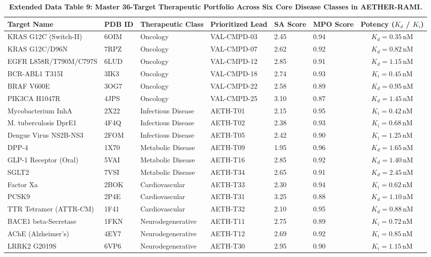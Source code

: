 \documentclass[11pt,a4paper]{article}
\begin{document}
\begin{table}[h!]
\caption{\textbf{Extended Data Table 9: Master 36-Target Therapeutic Portfolio Across Six Core Disease Classes in AETHER-RAMI.}}
\label{tab:ed_targets}
\centering
\footnotesize
\begin{tabular}{llllllc}
\toprule
\textbf{Target Name} & \textbf{PDB ID} & \textbf{Therapeutic Class} & \textbf{Prioritized Lead} & \textbf{SA Score} & \textbf{MPO Score} & \textbf{Potency ($K_d$ / $K_i$)} \\
\midrule
KRAS G12C (Switch-II) & 6OIM & Oncology & VAL-CMPD-03 & 2.45 & 0.94 & $K_d = 0.35$\,nM \\
KRAS G12C/D96N & 7RPZ & Oncology & VAL-CMPD-07 & 2.62 & 0.92 & $K_d = 0.82$\,nM \\
EGFR L858R/T790M/C797S & 6LUD & Oncology & VAL-CMPD-12 & 2.85 & 0.91 & $K_d = 1.15$\,nM \\
BCR-ABL1 T315I & 3IK3 & Oncology & VAL-CMPD-18 & 2.74 & 0.93 & $K_i = 0.45$\,nM \\
BRAF V600E & 3OG7 & Oncology & VAL-CMPD-22 & 2.58 & 0.89 & $K_d = 0.95$\,nM \\
PIK3CA H1047R & 4JPS & Oncology & VAL-CMPD-25 & 3.10 & 0.87 & $K_d = 1.45$\,nM \\
Mycobacterium InhA & 2X22 & Infectious Disease & AETH-T01 & 2.15 & 0.95 & $K_i = 0.42$\,nM \\
M. tuberculosis DprE1 & 4F4Q & Infectious Disease & AETH-T02 & 2.38 & 0.93 & $K_i = 0.68$\,nM \\
Dengue Virus NS2B-NS3 & 2FOM & Infectious Disease & AETH-T05 & 2.42 & 0.90 & $K_i = 1.25$\,nM \\
DPP-4 & 1X70 & Metabolic Disease & AETH-T09 & 1.95 & 0.96 & $K_d = 1.65$\,nM \\
GLP-1 Receptor (Oral) & 5VAI & Metabolic Disease & AETH-T16 & 2.85 & 0.92 & $K_d = 1.40$\,nM \\
SGLT2 & 7VSI & Metabolic Disease & AETH-T34 & 2.65 & 0.91 & $K_d = 2.45$\,nM \\
Factor Xa & 2BOK & Cardiovascular & AETH-T33 & 2.30 & 0.94 & $K_i = 0.62$\,nM \\
PCSK9 & 2P4E & Cardiovascular & AETH-T31 & 3.25 & 0.88 & $K_d = 1.10$\,nM \\
TTR Tetramer (ATTR-CM) & 1F41 & Cardiovascular & AETH-T32 & 2.10 & 0.95 & $K_d = 0.88$\,nM \\
BACE1 beta-Secretase & 1FKN & Neurodegenerative & AETH-T11 & 2.75 & 0.89 & $K_i = 0.72$\,nM \\
AChE (Alzheimer's) & 4EY7 & Neurodegenerative & AETH-T12 & 2.69 & 0.92 & $K_i = 0.85$\,nM \\
LRRK2 G2019S & 6VP6 & Neurodegenerative & AETH-T30 & 2.95 & 0.90 & $K_i = 1.15$\,nM \\
\bottomrule
\end{tabular}
\end{table}
\end{document}
